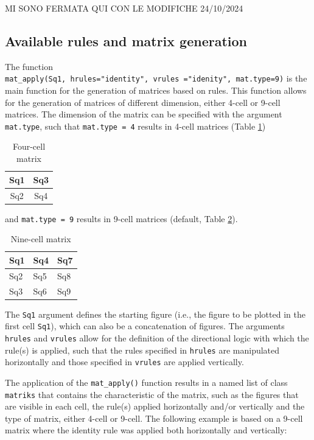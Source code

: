 MI SONO FERMATA QUI CON LE MODIFICHE 24/10/2024

\subsection{Available rules and matrix generation}\label{available-rules-and-matrix-generation}

The function \texttt{mat\_apply(Sq1,\ hrules="identity",\ vrules\ ="idenity",\ mat.type=9)} is the main function for the generation of matrices based on rules.
This function allows for the generation of matrices of different dimension, either 4-cell or 9-cell matrices.
The dimension of the matrix can be specified with the argument \texttt{mat.type}, such that \texttt{mat.type\ =\ 4} results in 4-cell matrices (Table \ref{tab:fourCell-static})

\begin{table}

\caption{\label{tab:fourCell-static}Four-cell matrix}
\centering
\begin{tabular}[t]{c|c}
\hline
Sq1 & Sq3\\
\hline
Sq2 & Sq4\\
\hline
\end{tabular}
\end{table}

and \texttt{mat.type\ =\ 9} results in 9-cell matrices (default, Table \ref{tab:nineCell-static}).

\begin{table}

\caption{\label{tab:nineCell-static}Nine-cell matrix}
\centering
\begin{tabular}[t]{l|l|l}
\hline
Sq1 & Sq4 & Sq7\\
\hline
Sq2 & Sq5 & Sq8\\
\hline
Sq3 & Sq6 & Sq9\\
\hline
\end{tabular}
\end{table}

The \texttt{Sq1} argument defines the starting figure (i.e., the figure to be plotted in the first cell \texttt{Sq1}), which can also be a concatenation of figures.
The arguments \texttt{hrules} and \texttt{vrules} allow for the definition of the directional logic with which the rule(s) is applied, such that the rules specified in \texttt{hrules} are manipulated horizontally and those specified in \texttt{vrules} are applied vertically.

The application of the \texttt{mat\_apply()} function results in a named list of class \texttt{matriks} that contains the characteristic of the matrix, such as the figures that are visible in each cell, the rule(s) applied horizontally and/or vertically and the type of matrix, either 4-cell or 9-cell.
The following example is based on a 9-cell matrix where the identity rule was applied both horizontally and vertically:

